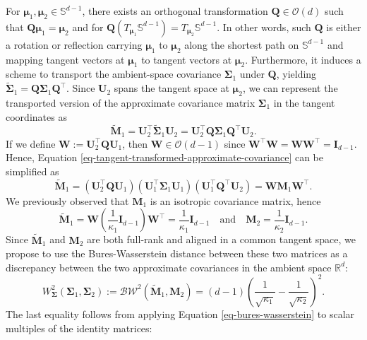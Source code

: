 \documentclass[10pt]{article}
\newcommand{\bfmu}{\boldsymbol{\mu}}
\newcommand{\bfM}{\boldsymbol{M}}
\newcommand{\bfQ}{\boldsymbol{Q}}
\newcommand{\bfI}{\boldsymbol{I}}
\newcommand{\bfU}{\boldsymbol{U}}
\newcommand{\bfW}{\boldsymbol{W}}
\newcommand{\bfSigma}{\boldsymbol{\Sigma}}
\newcommand{\bbR}{\mathbb{R}}
\newcommand{\bbS}{\mathbb{S}}
\begin{document}
For $\bfmu_1, \bfmu_2 \in \bbS^{d-1}$, there exists an orthogonal transformation $\bfQ \in \mathcal{O}(d)$ such that $\bfQ \bfmu_1 = \bfmu_2$ and for $\bfQ(T_{\bfmu_1} \bbS^{d-1}) = T_{\bfmu_2} \bbS^{d-1}$. In other words, such $\bfQ$ is either a rotation or reflection carrying $\bfmu_1$ to $\bfmu_2$ along the shortest path on $\bbS^{d-1}$ and mapping tangent vectors at $\bfmu_1$ to tangent vectors at $\bfmu_2$. Furthermore, it induces a scheme to transport the ambient-space covariance $\bfSigma_1$ under $\bfQ$, yielding $\tilde{\bfSigma}_1 = \bfQ \bfSigma_1 \bfQ^\top$. Since $\bfU_2$ spans the tangent space at $\bfmu_2$, we can represent the transported version of the approximate covariance matrix $\bfSigma_1$ in the tangent coordinates as
\begin{equation}\label{eq-tangent-transformed-approximate-covariance}
	\tilde{\bfM}_1 = \bfU_2^\top \tilde{\bfSigma}_1 \bfU_2 = \bfU_2^\top \bfQ \bfSigma_1 \bfQ^\top \bfU_2.
\end{equation}
If we define $\bfW := \bfU_2^\top \bfQ \bfU_1$, then $\bfW \in \mathcal{O}(d-1)$ since $\bfW^\top \bfW = \bfW \bfW^\top  = \bfI_{d-1}$. Hence, Equation \eqref{eq-tangent-transformed-approximate-covariance} can be simplified as 
\begin{equation}\label{eq-tangent-transformed-approximate-covariance-simplified}
	\tilde{\bfM}_1 = (\bfU_2^\top \bfQ \bfU_1) (\bfU_1^\top \bfSigma_1  \bfU_1)(\bfU_1^\top \bfQ^\top \bfU_2) =  \bfW \bfM_1 \bfW^\top.
\end{equation}
We previously observed that $\bfM_1$ is an isotropic covariance matrix, hence
\begin{equation}\label{eq-two-tangentialized-matrices}
\tilde{\bfM}_1 =  \bfW \left(
\frac{1}{\kappa_1} \bfI_{d-1} 
\right) \bfW^\top = \frac{1}{\kappa_1} \bfI_{d-1}\quad\textrm{and}\quad \bfM_2 = \frac{1}{\kappa_2}\bfI_{d-1}.
\end{equation}
Since $\tilde{\bfM}_1$ and $\bfM_2$ are both full-rank and aligned in a common tangent space, we propose to use the Bures-Wasserstein distance between these two matrices as a discrepancy between the two approximate covariances in the ambient space $\bbR^d$:
\begin{equation}\label{eq-W-EQ-covariance}
	W_{\bfSigma}^2 (\bfSigma_1, \bfSigma_2) := \mathcal{BW}^2 (\tilde{\bfM}_1, \bfM_2) = (d-1) \left(\frac{1}{\sqrt{\kappa_1}} - \frac{1}{\sqrt{\kappa_2}} \right)^2.
\end{equation}
The last equality follows from applying Equation  \eqref{eq-bures-wasserstein} to scalar multiples of the identity matrices:
\end{document}
